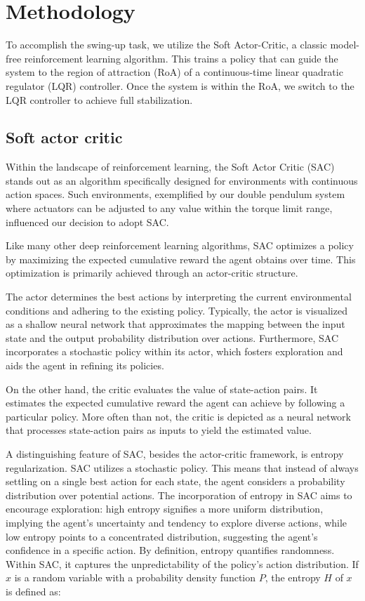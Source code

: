 \chapter{Methodology}
To accomplish the swing-up task, we utilize the Soft Actor-Critic, a classic model-free reinforcement learning algorithm. This trains a policy that can guide the system to the region of attraction (RoA) of a continuous-time linear quadratic regulator (LQR) controller. Once the system is within the RoA, we switch to the LQR controller to achieve full stabilization.

\section{Soft actor critic}
Within the landscape of reinforcement learning, the Soft Actor Critic (SAC) stands out as an algorithm specifically designed for environments with continuous action spaces. Such environments, exemplified by our double pendulum system where actuators can be adjusted to any value within the torque limit range, influenced our decision to adopt SAC.

Like many other deep reinforcement learning algorithms, SAC optimizes a policy by maximizing the expected cumulative reward the agent obtains over time. This optimization is primarily achieved through an actor-critic structure.

The actor determines the best actions by interpreting the current environmental conditions and adhering to the existing policy. Typically, the actor is visualized as a shallow neural network that approximates the mapping between the input state and the output probability distribution over actions. Furthermore, SAC incorporates a stochastic policy within its actor, which fosters exploration and aids the agent in refining its policies.

On the other hand, the critic evaluates the value of state-action pairs. It estimates the expected cumulative reward the agent can achieve by following a particular policy. More often than not, the critic is depicted as a neural network that processes state-action pairs as inputs to yield the estimated value.

A distinguishing feature of SAC, besides the actor-critic framework, is entropy regularization. SAC utilizes a stochastic policy. This means that instead of always settling on a single best action for each state, the agent considers a probability distribution over potential actions. The incorporation of entropy in SAC aims to encourage exploration: high entropy signifies a more uniform distribution, implying the agent's uncertainty and tendency to explore diverse actions, while low entropy points to a concentrated distribution, suggesting the agent's confidence in a specific action. By definition, entropy quantifies randomness. Within SAC, it captures the unpredictability of the policy's action distribution. If
\(x\) is a random variable with a probability density function \(P\), the
entropy \(H\) of \(x\) is defined as:

